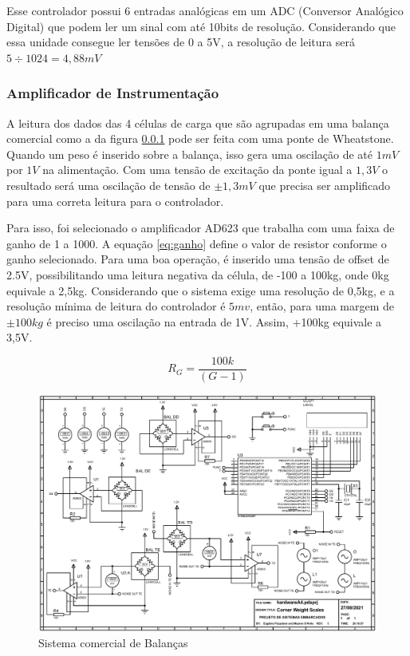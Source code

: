 \documentclass[a4paper, 12pt]{article}
\begin{document}
	Esse controlador possui 6 entradas analógicas em um ADC (Conversor Analógico Digital) que podem ler um sinal com até 10bits de resolução. Considerando que essa unidade consegue ler tensões de 0 a 5V, a resolução de leitura será $ 5\div 1024 = 4,88mV  $
	
	\subsubsection{Amplificador de Instrumentação}
	A leitura dos dados das 4 células de carga que são agrupadas em uma balança comercial como a da figura \ref{} pode ser feita com uma ponte de Wheatstone. Quando um peso é inserido sobre a balança, isso gera uma oscilação de até $ 1mV $ por $ 1V $ na alimentação. Com uma tensão de excitação da ponte igual a $ 1,3V $ o resultado será uma oscilação de tensão de $ \pm 1,3mV $ que precisa ser amplificado para uma correta leitura para o controlador. 
	
	Para isso, foi selecionado o amplificador AD623 que trabalha com uma faixa de ganho de 1 a 1000. A equação \ref{eq:ganho} define o valor de resistor conforme o ganho selecionado. Para uma boa operação, é inserido uma tensão de offset de 2.5V, possibilitando uma leitura negativa da célula, de -100 a 100kg, onde 0kg equivale a 2,5kg. Considerando que o sistema exige uma resolução de 0,5kg, e a resolução mínima de leitura do controlador é $ 5mv $, então, para uma margem de $ \pm100kg $ é preciso uma oscilação na entrada de 1V. Assim, +100kg equivale a 3,5V.
	
	\begin{equation}
		R_G = \dfrac{100k}{(G-1)}
		\label{eq:ganho}
	\end{equation}	

	
	\begin{figure}[!htb]
		\centering
		\includegraphics[width=.85\linewidth]{hardwareA4}
		\caption{Sistema comercial de Balanças}
		\label{fig:hardwarefinal}
	\end{figure}
\end{document}
